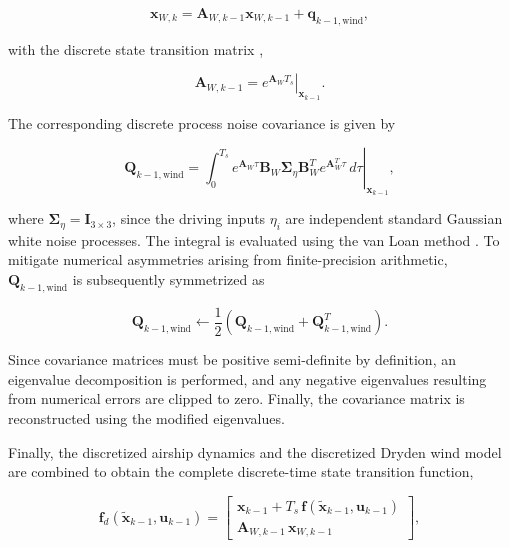 \begin{equation}
	\bm{x}_{W, k} 
	= 
	\bm{A}_{W, k-1} \bm{x}_{W, k-1} + \bm{q}_{k-1, \mathrm{wind}},
\end{equation}

with the discrete state transition matrix \cite{Astrom1997Discretization},

\begin{equation}
	\bm{A}_{W, k-1} 
	= 
	\left.
	e^{\bm{A}_W T_s}
	\right\vert_{\bm{x}_{k-1}}.
\end{equation}

The corresponding discrete process noise covariance is given by \cite{BarShalom2001Discretization}

\begin{equation}
	\bm{Q}_{k-1, \mathrm{wind}}
	=
	\left.
	\int_0^{T_s}
	e^{\bm{A}_W\tau}
	\bm{B}_W
	\bm{\Sigma}_{\eta}
	\bm{B}_W^T
	e^{\bm{A}_W^T\tau}
	\,d\tau
	\right\vert_{\bm{x}_{k-1}},
\end{equation}

where $\bm{\Sigma}_{\eta}=\bm{I}_{3\times3}$, since the driving inputs $\eta_i$ are independent standard Gaussian white noise processes. The integral is evaluated using the van Loan method \cite{VanLoan1978}.
To mitigate numerical asymmetries arising from finite-precision arithmetic, $\bm{Q}_{k-1,\mathrm{wind}}$ is subsequently symmetrized as

\begin{equation}
	\bm{Q}_{k-1,\mathrm{wind}} 
	\leftarrow 
	\frac{1}{2}
	\left(
	\bm{Q}_{k-1,\mathrm{wind}} + \bm{Q}_{k-1,\mathrm{wind}}^T
	\right).
\end{equation}

Since covariance matrices must be positive semi-definite by definition, an eigenvalue decomposition is performed, and any negative eigenvalues resulting from numerical errors are clipped to zero. Finally, the covariance matrix is reconstructed using the modified eigenvalues.

Finally, the discretized airship dynamics and the discretized Dryden wind model are combined to obtain the complete discrete-time state transition function,

\begin{equation}
	\bm{f}_d(\tilde{\bm{x}}_{k-1}, \bm{u}_{k-1})
	=
	\begin{bmatrix}
		\bm{x}_{k-1} + T_s\, \bm{f}(\tilde{\bm{x}}_{k-1}, \bm{u}_{k-1}) \\[2pt]
		\bm{A}_{W,k-1}\, \bm{x}_{W,k-1}
	\end{bmatrix},
\end{equation}

